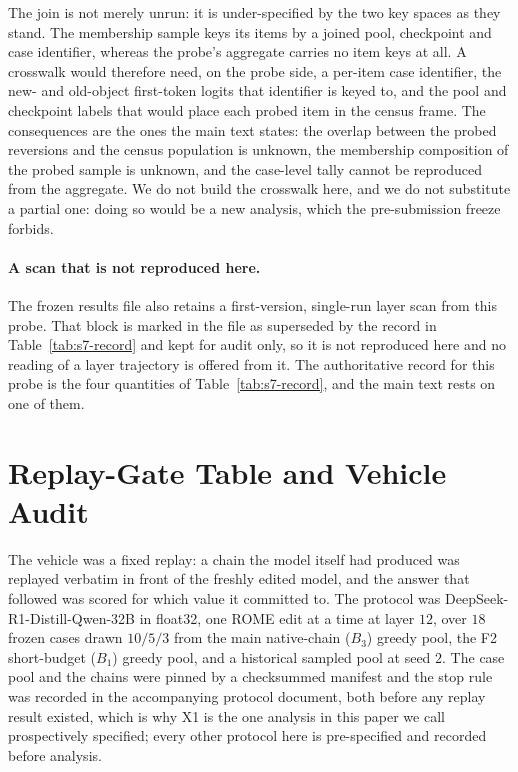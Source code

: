 \documentclass[letterpaper]{article}
\begin{document}
The join is not merely unrun: it is under-specified by the two key spaces as
they stand.  The membership sample keys its items by a joined pool, checkpoint
and case identifier, whereas the probe's aggregate carries no item keys at all.
A crosswalk would therefore need, on the probe side, a per-item case
identifier, the new- and old-object first-token logits that identifier is keyed
to, and the pool and checkpoint labels that would place each probed item in the
census frame.  The consequences are the ones the main text states: the overlap
between the probed reversions and the census population is unknown, the
membership composition of the probed sample is unknown, and the case-level
tally cannot be reproduced from the aggregate.  We do not build the crosswalk
here, and we do not substitute a partial one: doing so would be a new analysis,
which the pre-submission freeze forbids.

\paragraph{A scan that is not reproduced here.}
The frozen results file also retains a first-version, single-run layer scan
from this probe.  That block is marked in the file as superseded by the record
in Table~\ref{tab:s7-record} and kept for audit only, so it is not reproduced
here and no reading of a layer trajectory is offered from it.  The
authoritative record for this probe is the four quantities of
Table~\ref{tab:s7-record}, and the main text rests on one of them.

\section{Replay-Gate Table and Vehicle Audit}
The vehicle was a fixed replay: a chain the model itself had produced was
replayed verbatim in front of the freshly edited model, and the answer that
followed was scored for which value it committed to.  The protocol was
DeepSeek-R1-Distill-Qwen-32B in float32, one ROME edit at a time at layer
\(12\), over \(18\) frozen cases drawn \(10/5/3\) from the main native-chain
(\(B_3\)) greedy pool, the F2 short-budget (\(B_1\)) greedy pool, and a
historical sampled pool at seed \(2\).  The case pool and the chains were
pinned by a checksummed manifest and the stop rule was recorded in the
accompanying protocol document, both before any replay result existed, which
is why X1 is the one analysis in this paper we call prospectively specified;
every other protocol here is pre-specified and recorded before analysis.
\end{document}
